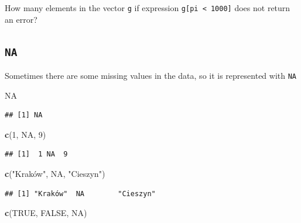 \documentclass[
]{book}
\makeatletter
\newenvironment{Shaded}{\begin{snugshade}}{\end{snugshade}}
\newcommand{\DecValTok}[1]{\textcolor[rgb]{0.00,0.00,0.81}{#1}}
\newcommand{\KeywordTok}[1]{\textcolor[rgb]{0.13,0.29,0.53}{\textbf{#1}}}
\newcommand{\NormalTok}[1]{#1}
\newcommand{\OtherTok}[1]{\textcolor[rgb]{0.56,0.35,0.01}{#1}}
\newcommand{\StringTok}[1]{\textcolor[rgb]{0.31,0.60,0.02}{#1}}
\newenvironment{kframe}{%
\medskip{}
\setlength{\fboxsep}{.8em}
 \def\at@end@of@kframe{}%
 \ifinner\ifhmode%
  \def\at@end@of@kframe{\end{minipage}}%
  \begin{minipage}{\columnwidth}%
 \fi\fi%
 \def\FrameCommand##1{\hskip\@totalleftmargin \hskip-\fboxsep
 \colorbox{shadecolor}{##1}\hskip-\fboxsep
     \hskip-\linewidth \hskip-\@totalleftmargin \hskip\columnwidth}%
 \MakeFramed {\advance\hsize-\width
   \@totalleftmargin\z@ \linewidth\hsize
   \@setminipage}}%
 {\par\unskip\endMakeFramed%
 \at@end@of@kframe}
\newenvironment{rmdblock}[1]
  {
  \begin{itemize}
  \renewcommand{\labelitemi}{
    \raisebox{-.7\height}[0pt][0pt]{
      {\setkeys{Gin}{width=3em,keepaspectratio}\texttt{[image: images/\#1]}}
    }
  }
  \setlength{\fboxsep}{1em}
  \begin{kframe}
  \item
  }
  {
  \end{kframe}
  \end{itemize}
  }
\newenvironment{rmdtask}
  {\begin{rmdblock}{task}}
  {\end{rmdblock}}
\makeatother
\begin{document}
\begin{rmdtask}
How many elements in the vector \texttt{g} if expression
\texttt{g{[}pi\ \textless{}\ 1000{]}} does not return an error?
\end{rmdtask}

\hypertarget{na}{%
\subsection{\texorpdfstring{\texttt{NA}}{NA}}\label{na}}

Sometimes there are some missing values in the data, so it is represented with \texttt{NA}

\begin{Shaded}
\begin{Highlighting}[]
\OtherTok{NA}
\end{Highlighting}
\end{Shaded}

\begin{verbatim}
## [1] NA
\end{verbatim}

\begin{Shaded}
\begin{Highlighting}[]
\KeywordTok{c}\NormalTok{(}\DecValTok{1}\NormalTok{, }\OtherTok{NA}\NormalTok{, }\DecValTok{9}\NormalTok{)}
\end{Highlighting}
\end{Shaded}

\begin{verbatim}
## [1]  1 NA  9
\end{verbatim}

\begin{Shaded}
\begin{Highlighting}[]
\KeywordTok{c}\NormalTok{(}\StringTok{"Kraków", NA, "}\NormalTok{Cieszyn}\StringTok{")}
\end{Highlighting}
\end{Shaded}

\begin{verbatim}
## [1] "Kraków"  NA        "Cieszyn"
\end{verbatim}

\begin{Shaded}
\begin{Highlighting}[]
\KeywordTok{c}\NormalTok{(}\OtherTok{TRUE}\NormalTok{, }\OtherTok{FALSE}\NormalTok{, }\OtherTok{NA}\NormalTok{)}
\end{Highlighting}
\end{Shaded}
\end{document}
